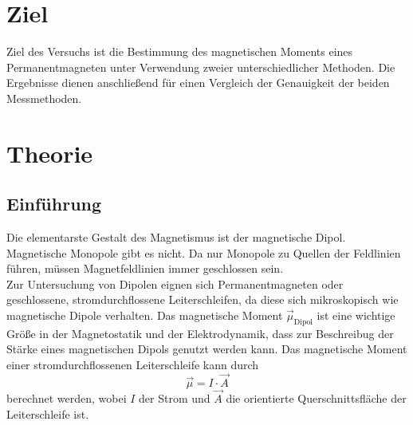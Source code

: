 \section{Ziel}
\label{sec:Ziel}
Ziel des Versuchs ist die Bestimmung des magnetischen Moments eines Permanentmagneten unter Verwendung zweier unterschiedlicher Methoden. Die Ergebnisse dienen anschließend
für einen Vergleich der Genauigkeit der beiden Messmethoden.

\section{Theorie}
\label{sec:Theorie}
\subsection{Einführung}
\label{subsec:Einführung}
Die elementarste Gestalt des Magnetismus ist der magnetische Dipol. Magnetische Monopole gibt es nicht. Da nur Monopole zu Quellen der Feldlinien führen,
müssen Magnetfeldlinien immer geschlossen sein. \\
Zur Untersuchung von Dipolen eignen sich Permanentmagneten oder geschlossene, stromdurchflossene Leiterschleifen, da diese sich mikroskopisch
wie magnetische Dipole verhalten. Das magnetische Moment $\vec{\mu}_{\text{Dipol}}$ ist eine wichtige Größe in der Magnetostatik und der Elektrodynamik, dass zur Beschreibug der
Stärke eines magnetischen Dipols genutzt werden kann. Das magnetische Moment einer stromdurchflossenen Leiterschleife kann durch 
\begin{equation}
\label{eqn:mu Leiterschleife}
    \vec{\mu} = I \cdot \vec{A}
\end{equation}
berechnet werden, wobei $I$ der Strom und $\vec{A}$ die orientierte Querschnittsfläche der Leiterschleife ist. \\

